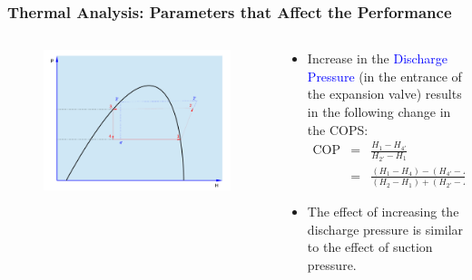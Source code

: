 \documentclass[10pt,compress]{beamer}
\newcommand{\frc}{\displaystyle\frac}
\begin{document}
\begin{frame}
 \frametitle{Thermal Analysis: Parameters that Affect the Performance}
 \begin{columns}
  \begin{column}[c]{0.3\linewidth}
   \begin{figure}%
      \includegraphics[width=4.cm,height=4.cm,clip]{./Pics/Overview_Refrig21}
   \end{figure}  
  \end{column}  
  \begin{column}[c]{0.7\linewidth}
   \begin{itemize}
    \item <1-> Increase in the \textcolor{blue}{Discharge Pressure} (in the entrance of the expansion valve) results in the following change in the COPS:
     \begin{eqnarray}
      \text{COP}&=&\frc{H_{1}-H_{4'}}{H_{2'}-H_{1}} \nonumber \\
                                  &=& \frc{\left(H_{1}-H_{4}\right)-\left(H_{4'}-H_{4}\right)}{\left(H_{2}-H_{1}\right)+\left(H_{2'}-H_{2}\right)} \nonumber 
     \end{eqnarray} 
    \item <2-> The  effect of increasing the discharge pressure is similar to the effect of suction pressure.
   \end{itemize}
  \end{column}  
 \end{columns}
\end{frame}
\end{document}
